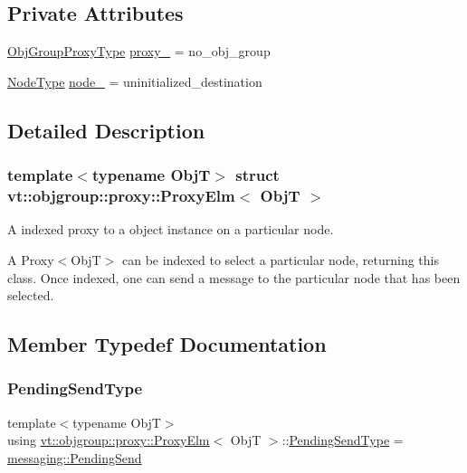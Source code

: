 \subsection*{Private Attributes}
\begin{DoxyCompactItemize}
\item 
\hyperlink{namespacevt_ad7cae989df485fccca57f0792a880a8e}{Obj\+Group\+Proxy\+Type} \hyperlink{structvt_1_1objgroup_1_1proxy_1_1_proxy_elm_ab8a57044d257ea520a080de9f3389ba5}{proxy\+\_\+} = no\+\_\+obj\+\_\+group
\item 
\hyperlink{namespacevt_a866da9d0efc19c0a1ce79e9e492f47e2}{Node\+Type} \hyperlink{structvt_1_1objgroup_1_1proxy_1_1_proxy_elm_a0655b033581faad1cab6bf7402e36aac}{node\+\_\+} = uninitialized\+\_\+destination
\end{DoxyCompactItemize}


\subsection{Detailed Description}
\subsubsection*{template$<$typename ObjT$>$\newline
struct vt\+::objgroup\+::proxy\+::\+Proxy\+Elm$<$ Obj\+T $>$}

A indexed proxy to a object instance on a particular node. 

A {\ttfamily Proxy$<$\+Obj\+T$>$} can be indexed to select a particular node, returning this class. Once indexed, one can send a message to the particular node that has been selected. 

\subsection{Member Typedef Documentation}
\mbox{\label{structvt_1_1objgroup_1_1proxy_1_1_proxy_elm_ab0f40d6a0191c974a4f4dd9dec0fc02f}} 
\subsubsection{\texorpdfstring{Pending\+Send\+Type}{PendingSendType}}
{\footnotesize\ttfamily template$<$typename ObjT$>$ \\
using \hyperlink{structvt_1_1objgroup_1_1proxy_1_1_proxy_elm}{vt\+::objgroup\+::proxy\+::\+Proxy\+Elm}$<$ ObjT $>$\+::\hyperlink{structvt_1_1objgroup_1_1proxy_1_1_proxy_elm_ab0f40d6a0191c974a4f4dd9dec0fc02f}{Pending\+Send\+Type} =  \hyperlink{structvt_1_1messaging_1_1_pending_send}{messaging\+::\+Pending\+Send}}




